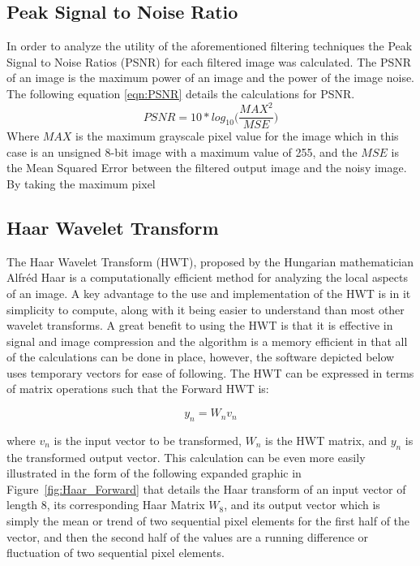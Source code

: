 \documentclass{article}
\begin{document}
\subsection{Peak Signal to Noise Ratio}
In order to analyze the utility of the aforementioned filtering techniques the Peak Signal to Noise Ratios (PSNR) for each filtered image was calculated. The PSNR of an image is the maximum power of an image and the power of the image noise. The following equation \ref{eqn:PSNR} details the calculations for PSNR.
\begin{equation}\label{eqn:PSNR}
PSNR = 10*log_{10}\Big(\frac{MAX^2}{MSE}\Big)
\end{equation}	 
Where $MAX$ is the maximum grayscale pixel value for the image which in this case is an unsigned 8-bit image with a maximum value of 255, and the $MSE$ is the Mean Squared Error between the filtered output image and the noisy image. By taking the maximum pixel
 
\subsection{Haar Wavelet Transform}
The Haar Wavelet Transform (HWT), proposed by the Hungarian mathematician Alfr\'ed Haar is a computationally efficient method for analyzing the local aspects of an image. A key advantage to the use and implementation of the HWT is in it simplicity to compute, along with it being easier to understand than most other wavelet transforms. A great benefit to using the HWT is that it is effective in signal and image compression and the algorithm is a memory efficient in that all of the calculations can be done in place, however, the software depicted below uses temporary vectors for ease of following. The HWT can be expressed in terms of matrix operations such that the Forward HWT is:  

\begin{equation}\label{eqn:Forward_HWT}
y_{n} = W_{n}v_{n}
\end{equation}	 
 
 where $v_{n}$ is the input vector to be transformed, $W_{n}$ is the HWT matrix, and $y_{n}$ is the transformed output vector. This calculation can be even more easily illustrated in the form of the following expanded graphic in Figure~\ref{fig:Haar_Forward} that details the Haar transform of an input vector of length $8$, its corresponding Haar Matrix $W_{8}$, and its output vector which is simply the mean or trend of two sequential pixel elements for the first half of the vector, and then the second half of the values are a running difference or fluctuation of two sequential pixel elements. 
 
\end{document}
